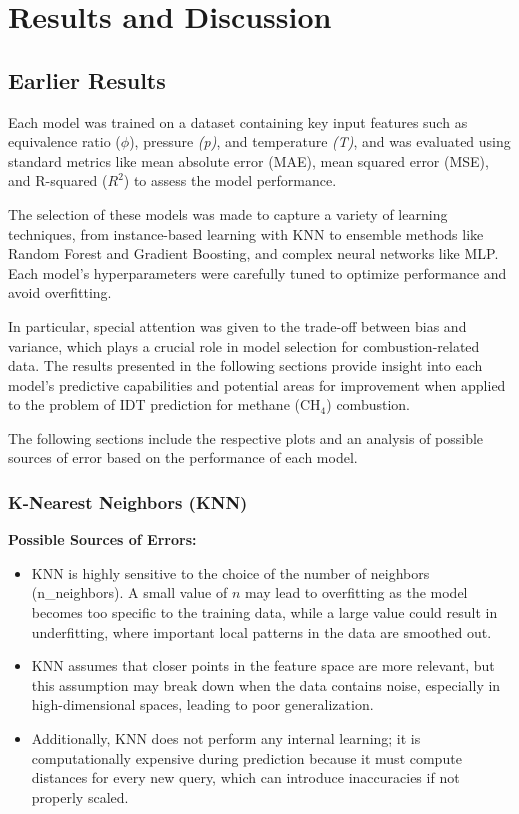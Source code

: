 \documentclass[12pt]{report}
\begin{document}

\chapter{Results and Discussion}
\section{Earlier Results}
Each model was trained on a dataset containing key input features such as equivalence ratio (\(\phi\)), pressure \textit{(p)}, and temperature \textit{(T)}, and was evaluated using standard metrics like mean absolute error (MAE), mean squared error (MSE), and R-squared (\(R^2\)) to assess the model performance.

The selection of these models was made to capture a variety of learning techniques, from instance-based learning with KNN to ensemble methods like Random Forest and Gradient Boosting, and complex neural networks like MLP. Each model’s hyperparameters were carefully tuned to optimize performance and avoid overfitting.

In particular, special attention was given to the trade-off between bias and variance, which plays a crucial role in model selection for combustion-related data. The results presented in the following sections provide insight into each model’s predictive capabilities and potential areas for improvement when applied to the problem of IDT prediction for methane (CH\(_4\)) combustion.

The following sections include the respective plots and an analysis of possible sources of error based on the performance of each model.

\subsection{K-Nearest Neighbors (KNN)}
\textbf{Possible Sources of Errors:} 
\begin{itemize}
    \item KNN is highly sensitive to the choice of the number of neighbors (n\_neighbors). A small value of \(n\) may lead to overfitting as the model becomes too specific to the training data, while a large value could result in underfitting, where important local patterns in the data are smoothed out.
    \item KNN assumes that closer points in the feature space are more relevant, but this assumption may break down when the data contains noise, especially in high-dimensional spaces, leading to poor generalization.
    \item Additionally, KNN does not perform any internal learning; it is computationally expensive during prediction because it must compute distances for every new query, which can introduce inaccuracies if not properly scaled.
\end{itemize}
\end{document}
